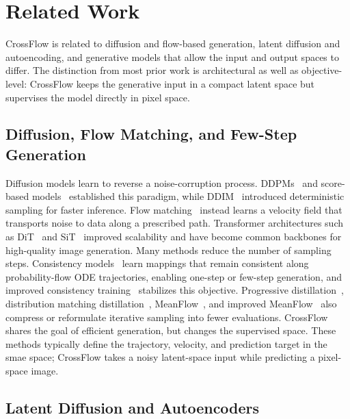 \section{Related Work}

CrossFlow is related to diffusion and flow-based generation, latent diffusion and autoencoding, and generative models that allow the input and output spaces to differ. The distinction from most prior work is architectural as well as objective-level: CrossFlow keeps the generative input in a compact latent space but supervises the model directly in pixel space.

\subsection{Diffusion, Flow Matching, and Few-Step Generation}

Diffusion models learn to reverse a noise-corruption process. DDPMs~\citep{DDPM} and score-based models~\citep{NCSM} established this paradigm, while DDIM~\citep{DDIM} introduced deterministic sampling for faster inference. Flow matching~\citep{FlowMatching,rf} instead learns a velocity field that transports noise to data along a prescribed path. Transformer architectures such as DiT~\citep{dit} and SiT~\citep{sit} improved scalability and have become common backbones for high-quality image generation. Many methods reduce the number of sampling steps. Consistency models~\citep{CM} learn mappings that remain consistent along probability-flow ODE trajectories, enabling one-step or few-step generation, and improved consistency training~\citep{ICT} stabilizes this objective. Progressive distillation~\citep{ProgressiveDistillation}, distribution matching distillation~\citep{DMD}, MeanFlow~\citep{meanflow}, and improved MeanFlow~\citep{imf} also compress or reformulate iterative sampling into fewer evaluations. CrossFlow shares the goal of efficient generation, but changes the supervised space. These methods typically define the trajectory, velocity, and prediction target in the smae space; CrossFlow takes a noisy latent-space input while predicting a pixel-space image.

\subsection{Latent Diffusion and Autoencoders}


